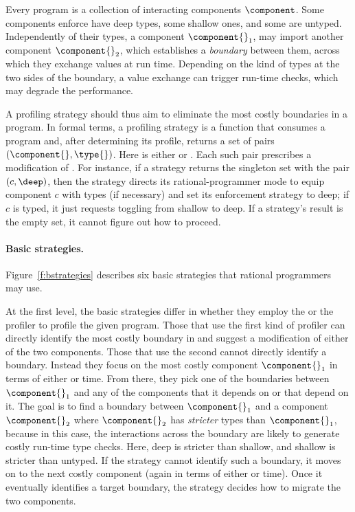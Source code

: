 Every program \program{} is a collection of interacting components $\component$.
Some components enforce have deep types, some shallow ones, and some
are untyped. Independently of their types, a component $\component{}_1$, may
import another component $\component{}_2$, which establishes a \emph{boundary}
between them, across which they exchange values at run time. Depending on the
kind of types at the two sides of the boundary, a value exchange can trigger
run-time checks, which may degrade the performance.

A profiling strategy should thus aim to eliminate the most costly boundaries in
a program. In formal terms, a profiling strategy is a function that consumes a
program \program{} and, after determining its profile, returns a set of pairs
$(\component{}, \type{})$. Here \type{} is either \deep{} or \shallow{}. Each
such pair prescribes a modification of \program{}. For instance, if a strategy
returns the singleton set with the pair $(c, \deep)$, then the strategy directs
its rational-programmer mode to equip component $c$ with types (if necessary)
and set its enforcement strategy to deep; if $c$ is typed, it just requests
toggling from shallow to deep.  If a strategy's result is the empty set, it
cannot figure out how to proceed.



\paragraph{Basic strategies.}  Figure~\ref{f:bstrategies} describes six basic
 strategies that rational programmers may use. 

At the first level, the basic strategies differ in whether they employ the
 \featkw{} or the \statkw{} profiler to profile the given program.  Those that
 use the first kind of profiler can directly identify the most costly boundary
 in \program{} and suggest a modification of either of the two components.
 Those that use the second cannot directly identify a boundary.  Instead they
 focus on the most costly component $\component{}_1$ in terms of either
 \selfkw{} or \totalkw{} time.  From there, they pick one of the boundaries
 between $\component{}_1$ and any of the components that it depends on or that
 depend on it. The goal is to find a boundary between $\component{}_1$ and a
 component $\component{}_2$ where $\component{}_2$ has \emph{stricter} types
 than $\component{}_1$, because in this case, the interactions across the
 boundary are likely to generate costly run-time type checks. Here, deep is
 stricter than shallow, and shallow is stricter than untyped. If the strategy
 cannot identify such a boundary, it moves on to the next costly component
 (again in terms of either \selfkw{} or \totalkw{} time). Once it eventually
 identifies a target boundary, the strategy decides how to migrate the
 two components.


